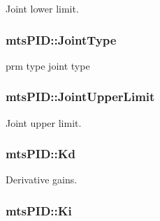 Joint lower limit. 

\hypertarget{classmts_p_i_d_ae108b12c62723774cee553f7e76213f6}{
\subsubsection[{Joint\-Type}]{ mts\-P\-I\-D\-::\-Joint\-Type\hspace{0.3cm}{\ttfamily [protected]}}}\label{classmts_p_i_d_ae108b12c62723774cee553f7e76213f6}


prm type joint type 

\hypertarget{classmts_p_i_d_a6a6f2a5123f6816f47d5c752ba7020d5}{
\subsubsection[{Joint\-Upper\-Limit}]{ mts\-P\-I\-D\-::\-Joint\-Upper\-Limit\hspace{0.3cm}{\ttfamily [protected]}}}\label{classmts_p_i_d_a6a6f2a5123f6816f47d5c752ba7020d5}


Joint upper limit. 

\hypertarget{classmts_p_i_d_a4d288bb566a2c45834c1f028cad03b3f}{
\subsubsection[{Kd}]{ mts\-P\-I\-D\-::\-Kd\hspace{0.3cm}{\ttfamily [protected]}}}\label{classmts_p_i_d_a4d288bb566a2c45834c1f028cad03b3f}


Derivative gains. 

\hypertarget{classmts_p_i_d_a979243fca1ea255c49b241658246d964}{
\subsubsection[{Ki}]{ mts\-P\-I\-D\-::\-Ki\hspace{0.3cm}{\ttfamily [protected]}}}\label{classmts_p_i_d_a979243fca1ea255c49b241658246d964}


